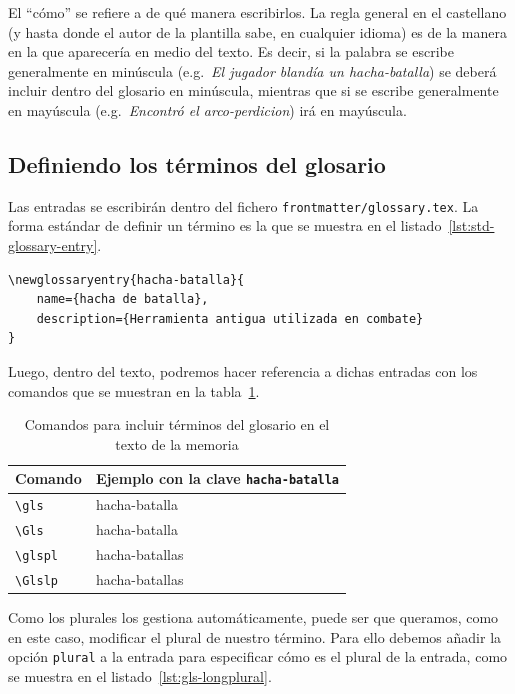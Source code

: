 El \enquote{cómo} se refiere a de qué manera escribirlos. La regla general en el castellano (y hasta donde el autor de la plantilla sabe, en cualquier idioma) es de la manera en la que aparecería en medio del texto. Es decir, si la palabra se escribe generalmente en minúscula (e.g.~\textit{El jugador blandía un \gls{hacha-batalla}}) se deberá incluir dentro del glosario en minúscula, mientras que si se escribe generalmente en mayúscula (e.g.~\textit{Encontró el \gls{arco-perdicion}}) irá en mayúscula.

\subsection{Definiendo los términos del glosario}

Las entradas se escribirán dentro del fichero \texttt{frontmatter/glossary.tex}. La forma estándar de definir un término es la que se muestra en el listado~\ref{lst:std-glossary-entry}.

\begin{lstlisting}[language={[latex]TeX},caption=Código para crear una entrada en el glosario,label=lst:std-glossary-entry]
\newglossaryentry{hacha-batalla}{
    name={hacha de batalla},
    description={Herramienta antigua utilizada en combate}
}
\end{lstlisting}

Luego, dentro del texto, podremos hacer referencia a dichas entradas con los comandos que se muestran en la tabla~\ref{tab:glossary-commands}.

\begin{table}[h]
    \caption{\label{tab:glossary-commands}Comandos para incluir términos del glosario en el texto de la memoria}
    \begin{tabularx}{\textwidth}{@{}lX@{}}
        \toprule
        \textbf{Comando} & \textbf{Ejemplo con la clave \texttt{hacha-batalla}} \\
        \midrule
        \texttt{\textbackslash gls} & \gls{hacha-batalla} \\
        \texttt{\textbackslash Gls} & \Gls{hacha-batalla} \\
        \texttt{\textbackslash glspl} & \glspl{hacha-batalla} \\
        \texttt{\textbackslash Glslp} & \Glspl{hacha-batalla} \\
        \bottomrule
    \end{tabularx}
\end{table}

Como los plurales los gestiona automáticamente, puede ser que queramos, como en este caso, modificar el plural de nuestro término. Para ello debemos añadir la opción \texttt{plural} a la entrada para especificar cómo es el plural de la entrada, como se muestra en el listado~\ref{lst:gls-longplural}.

